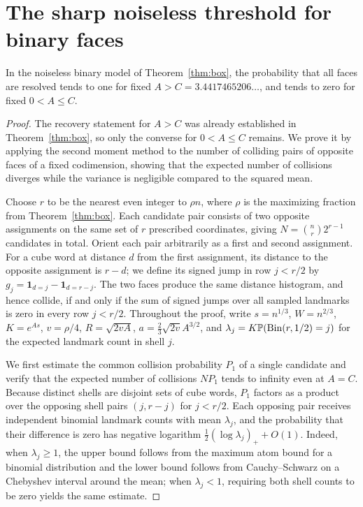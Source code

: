 \section{The sharp noiseless threshold for binary faces}\label{sec:noiseless-face-proof}
\begin{theorem}\label{thm:face-wHP}
In the noiseless binary model of Theorem~\ref{thm:box}, the probability
that all faces are resolved tends to one for fixed
\(A>C=3.4417465206\ldots\), and tends to zero for fixed \(0<A\le C\).
\end{theorem}

\begin{proof}
The recovery statement for \(A>C\) was already established in Theorem~\ref{thm:box}, so only the converse for \(0<A\le C\) remains. We prove it by applying the second moment method to the number of colliding pairs of opposite faces of a fixed codimension, showing that the expected number of collisions diverges while the variance is negligible compared to the squared mean.

Choose \(r\) to be the nearest even integer to \(\rho n\), where \(\rho\) is the maximizing fraction from Theorem~\ref{thm:box}. Each candidate pair consists of two opposite assignments on the same set of \(r\) prescribed coordinates, giving \(N=\binom nr2^{r-1}\) candidates in total. Orient each pair arbitrarily as a first and second assignment. For a cube word at distance \(d\) from the first assignment, its distance to the opposite assignment is \(r-d\); we define its signed jump in row \(j<r/2\) by \(g_j=\mathbf1_{d=j}-\mathbf1_{d=r-j}\). The two faces produce the same distance histogram, and hence collide, if and only if the sum of signed jumps over all sampled landmarks is zero in every row \(j<r/2\). Throughout the proof, write \(s=n^{1/3}\), \(W=n^{2/3}\), \(K=e^{As}\), \(v=\rho/4\), \(R=\sqrt{2vA}\), \(a=\tfrac23\sqrt{2v}A^{3/2}\), and \(\lambda_j=K\mathbb P(\operatorname{Bin}(r,1/2)=j)\) for the expected landmark count in shell \(j\).

We first estimate the common collision probability \(P_1\) of a single candidate and verify that the expected number of collisions \(NP_1\) tends to infinity even at \(A=C\). Because distinct shells are disjoint sets of cube words, \(P_1\) factors as a product over the opposing shell pairs \((j,r-j)\) for \(j<r/2\). Each opposing pair receives independent binomial landmark counts with mean \(\lambda_j\), and the probability that their difference is zero has negative logarithm \(\tfrac12(\log\lambda_j)_++O(1)\). Indeed, when \(\lambda_j\ge1\), the upper bound follows from the maximum atom bound for a binomial distribution and the lower bound follows from Cauchy--Schwarz on a Chebyshev interval around the mean; when \(\lambda_j<1\), requiring both shell counts to be zero yields the same estimate.


\end{proof}
